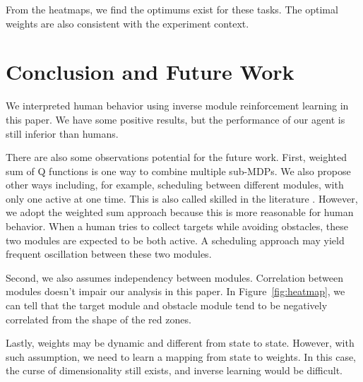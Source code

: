 \documentclass[11pt]{article} %
\begin{document}
From the heatmaps, we find the optimums exist for these tasks. The optimal
weights are also consistent with the experiment context.

\section{Conclusion and Future Work}
\label{sec:conclude}

We interpreted human behavior using inverse module reinforcement learning in
this paper. We have some positive results, but the performance of our agent is
still inferior than humans.

There are also some observations potential for the future work. First, 
weighted sum of Q functions is one way to combine multiple sub-MDPs. We also
propose other ways including, for example, scheduling between different modules,
with only one active at one time. This is also called skilled in the literature
\cite{konidaris2009skill}. However, we adopt the weighted sum approach
because this is more reasonable for human behavior. When a human tries to collect
targets while avoiding obstacles, these two modules are expected to be both
active. A scheduling approach may yield frequent oscillation between these two
modules.

Second, we also assumes independency between modules. Correlation between
modules doesn't impair our analysis in this paper. In Figure~\ref{fig:heatmap},
we can tell that the target module and obstacle module tend to be negatively
correlated from the shape of the red zones.

Lastly, weights may be dynamic and different from state to state. However, with
such assumption, we need to learn a mapping from state to weights. In this case,
the curse of dimensionality still exists, and inverse learning would be
difficult.



\end{document}
